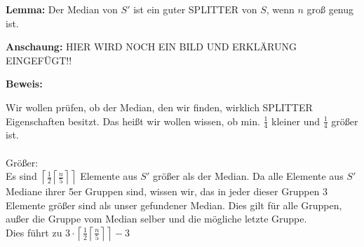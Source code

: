 \begin{description}
\begin{description}

\item{\bfseries Lemma:} Der Median von $S'$ ist ein guter SPLITTER von $S$, wenn $n$ groß genug ist.

\item{\bfseries Anschaung:} HIER WIRD NOCH EIN BILD UND ERKLÄRUNG EINGEFÜGT!!

\item{\bfseries Beweis:}

Wir wollen prüfen, ob der Median, den wir finden, wirklich SPLITTER Eigenschaften besitzt. Das heißt wir wollen wissen, ob min. $\frac{1}{4}$ kleiner und $\frac{1}{4}$ größer ist.\\
\vspace{\baselineskip}\\
Größer:\\
Es sind $\left\lceil \frac{1}{2} \left\lceil \frac{n}{5} \right\rceil \right\rceil$ Elemente aus $S'$ größer als der Median. Da alle Elemente aus $S'$ Mediane ihrer 5er Gruppen sind, wissen wir, das in jeder dieser Gruppen 3 Elemente größer sind als unser gefundener Median. Dies gilt für alle Gruppen, außer die Gruppe vom Median selber und die mögliche letzte Gruppe.\\
Dies führt zu $3 \cdot \left\lceil \frac{1}{2} \left\lceil \frac{n}{5} \right\rceil \right\rceil -3$\\
\vspace{\baselineskip}\\ 
\end{description} 

\end{description}